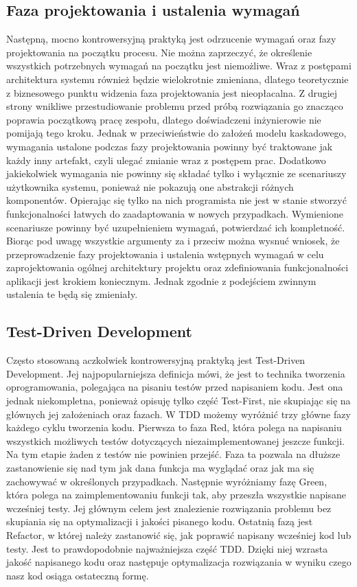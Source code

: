 \subsection{Faza projektowania i ustalenia wymagań}
\label{subsec:fazaProjektowania}

Następną, mocno kontrowersyjną praktyką jest odrzucenie wymagań oraz fazy
projektowania na początku procesu. Nie można zaprzeczyć, że określenie wszystkich
potrzebnych wymagań na początku jest niemożliwe. Wraz z postępami architektura systemu
również będzie wielokrotnie zmieniana, dlatego teoretycznie z biznesowego punktu widzenia
faza projektowania jest nieopłacalna. Z drugiej strony wnikliwe przestudiowanie problemu
przed próbą rozwiązania go znacząco poprawia początkową pracę zespołu, dlatego
doświadczeni inżynierowie nie pomijają tego kroku\cite{AGI01}. Jednak w przeciwieństwie do założeń
modelu kaskadowego, wymagania ustalone podczas fazy projektowania powinny być
traktowane jak każdy inny artefakt, czyli ulegać zmianie wraz z postępem prac.
Dodatkowo jakiekolwiek wymagania nie powinny się składać tylko i wyłącznie ze
scenariuszy użytkownika systemu, ponieważ nie pokazują one abstrakcji różnych
komponentów. Opierając się tylko na nich programista nie jest w stanie stworzyć funkcjonalności
łatwych do zaadaptowania w nowych przypadkach. Wymienione scenariusze powinny być
uzupełnieniem wymagań, potwierdzać ich kompletność. Biorąc pod uwagę wszystkie
argumenty za i przeciw można wysnuć wniosek, że przeprowadzenie fazy projektowania i
ustalenia wstępnych wymagań w celu zaprojektowania ogólnej architektury projektu oraz
zdefiniowania funkcjonalności aplikacji jest krokiem koniecznym. Jednak zgodnie z
podejściem zwinnym ustalenia te będą się zmieniały.

\subsection{Test-Driven Development}

Często stosowaną aczkolwiek kontrowersyjną praktyką jest Test-Driven Development. Jej
najpopularniejsza definicja\cite{TDD04} mówi, że jest to technika tworzenia oprogramowania, polegająca
na pisaniu testów przed napisaniem kodu. Jest ona jednak niekompletna, ponieważ opisuję
tylko część Test-First, nie skupiając się na głównych jej założeniach oraz fazach. W TDD
możemy wyróżnić trzy główne fazy każdego cyklu tworzenia kodu. Pierwsza to faza Red,
która polega na napisaniu wszystkich możliwych testów dotyczących niezaimplementowanej
jeszcze funkcji. Na tym etapie żaden z testów nie powinien przejść. Faza ta pozwala na
dłuższe zastanowienie się nad tym jak dana funkcja ma wyglądać oraz jak ma się
zachowywać w określonych przypadkach. Następnie wyróżniamy fazę Green, która polega na
zaimplementowaniu funkcji tak, aby przeszła wszystkie napisane wcześniej testy. Jej
głównym celem jest znalezienie rozwiązania problemu bez skupiania się na optymalizacji i
jakości pisanego kodu. Ostatnią fazą jest Refactor, w której należy zastanowić się, jak
poprawić napisany wcześniej kod lub testy. Jest to prawdopodobnie najważniejsza część
TDD. Dzięki niej wzrasta jakość napisanego kodu oraz następuje optymalizacja rozwiązania
w wyniku czego nasz kod osiąga ostateczną formę.

